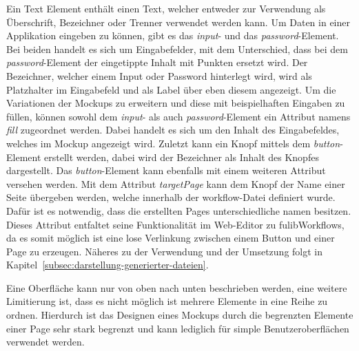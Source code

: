 Ein Text Element enthält einen Text, welcher entweder zur Verwendung als Überschrift, Bezeichner oder Trenner verwendet werden kann.
Um Daten in einer Applikation eingeben zu können, gibt es das \textit{input}- und das \textit{password}-Element.
Bei beiden handelt es sich um Eingabefelder, mit dem Unterschied, dass bei dem \textit{password}-Element der eingetippte Inhalt mit Punkten ersetzt wird.
Der Bezeichner, welcher einem Input oder Password hinterlegt wird, wird als Platzhalter im Eingabefeld und als Label über eben diesem angezeigt.
Um die Variationen der Mockups zu erweitern und diese mit beispielhaften Eingaben zu füllen, können sowohl dem \textit{input}- als auch \textit{password}-Element
ein Attribut namens \textit{fill} zugeordnet werden.
Dabei handelt es sich um den Inhalt des Eingabefeldes, welches im Mockup angezeigt wird.
Zuletzt kann ein Knopf mittels dem \textit{button}-Element erstellt werden, dabei wird der Bezeichner als Inhalt des Knopfes dargestellt.
Das \textit{button}-Element kann ebenfalls mit einem weiteren Attribut versehen werden.
Mit dem Attribut \textit{targetPage} kann dem Knopf der Name einer Seite übergeben werden, welche innerhalb der workflow-Datei definiert wurde.
Dafür ist es notwendig, dass die erstellten Pages unterschiedliche namen besitzen.
Dieses Attribut entfaltet seine Funktionalität im Web-Editor zu fulibWorkflows, da es somit möglich ist eine lose Verlinkung zwischen einem Button und einer Page
zu erzeugen.
Näheres zu der Verwendung und der Umsetzung folgt in Kapitel~\ref{subsec:darstellung-generierter-dateien}.

Eine Oberfläche kann nur von oben nach unten beschrieben werden, eine weitere Limitierung ist, dass es nicht möglich ist mehrere Elemente in eine Reihe zu ordnen.
Hierdurch ist das Designen eines Mockups durch die begrenzten Elemente einer Page sehr stark begrenzt und kann lediglich für
simple Benutzeroberflächen verwendet werden.
